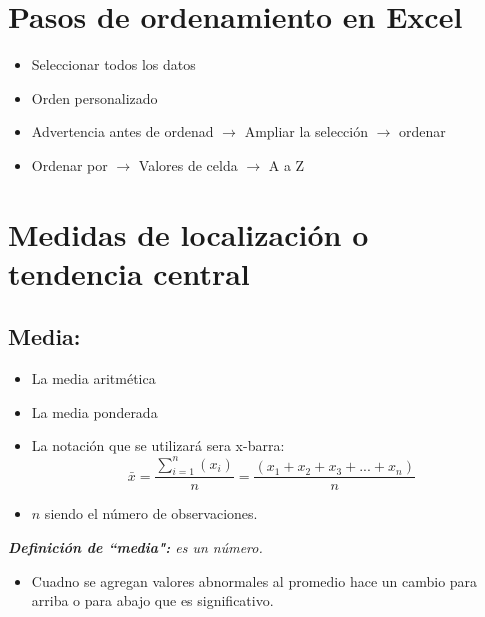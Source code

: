 \section{Pasos de ordenamiento en Excel}
\begin{itemize}[label=$\downarrow$]
    \item Seleccionar todos los datos 
    \item Orden personalizado
    \item Advertencia antes de ordenad $\rightarrow$ Ampliar la selección $\rightarrow$ ordenar 
    \item Ordenar por $\rightarrow$ Valores de celda $\rightarrow$ A a Z
\end{itemize}
\section{Medidas de localización o tendencia central}   
\subsection{Media:}
\begin{itemize}
    \item La media aritmética 
    \item La media ponderada
\end{itemize}
\begin{itemize}
    \item La notación que se utilizará sera x-barra:
        \[
            \bar{x} = \frac{\sum_{i=1}^{n}(x_{i})}{n} = \frac{(x_{1} + x_{2} + x_{3} + ... + x_{n})}{n} 
        \]
    
    \item $n$ siendo el número de observaciones.
\end{itemize}
\emph{\textbf{Definición de ``media":} es un número.}
\begin{itemize}
    \item Cuadno se agregan valores abnormales al promedio hace un cambio para arriba o para abajo que es significativo.
\end{itemize}

